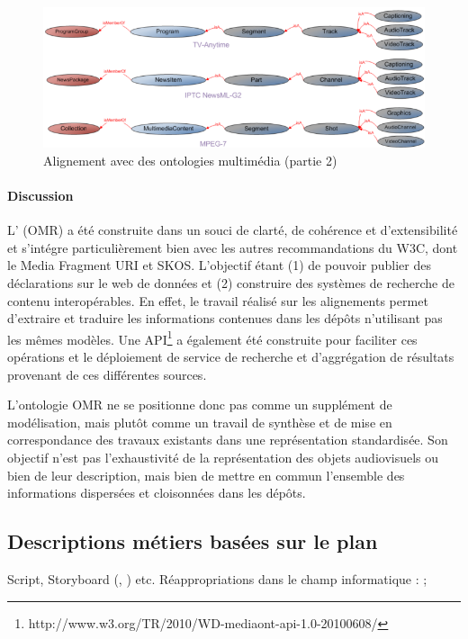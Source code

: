 \begin{figure}[ht!]
\centering
\includegraphics[width=\textwidth]{images/MA-alignement-B.png}
\caption{Alignement avec des ontologies multimédia (partie 2)}
\label{img:ma-alignement-B}
\end{figure}

\paragraph{Discussion}
L' (OMR) a été construite dans un souci de clarté, de cohérence et d'extensibilité et s'intégre particulièrement bien avec les autres recommandations du W3C, dont le Media Fragment URI et SKOS.
L'objectif étant (1) de pouvoir publier des déclarations sur le web de données et (2) construire des systèmes de recherche de contenu interopérables. 
En effet, le travail réalisé sur les alignements permet d'extraire et traduire les informations contenues dans les dépôts n'utilisant pas les mêmes modèles.
Une API\footnote{http://www.w3.org/TR/2010/WD-mediaont-api-1.0-20100608/} a également été construite pour faciliter ces opérations et le déploiement de service de recherche et d'aggrégation de résultats provenant de ces différentes sources.

L'ontologie OMR ne se positionne donc pas comme un supplément de modélisation, mais plutôt comme un travail de synthèse et de mise en correspondance des travaux existants dans une représentation standardisée.
Son objectif n'est pas l'exhaustivité de la représentation des objets audiovisuels ou bien de leur description, mais bien de mettre en commun l'ensemble des informations dispersées et cloisonnées dans les dépôts.





\subsection{Descriptions métiers basées sur le plan}
Script, Storyboard (\cite{Martin2005}, \cite{ThiBui2003}) etc.
Réappropriations dans le champ informatique : \cite{Chakravarthy2009b} ; \cite{Chakravarthy2009c}

